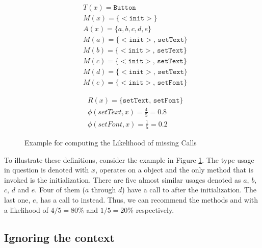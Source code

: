 \begin{figure}[h]
    \begin{subfigure}[c]{0.45\textwidth}
        \begin{align*}
& T(x) = \mathtt{Button} \\
& M(x) = \{ \mathtt{<\!\!init\!\!>} \} \\
& A(x) = \{ a, b, c, d, e \} \\
& M(a) = \{ \mathtt{<\!\!init\!\!>},\, \mathtt{setText} \} \\
& M(b) = \{ \mathtt{<\!\!init\!\!>},\, \mathtt{setText} \} \\
& M(c) = \{ \mathtt{<\!\!init\!\!>},\, \mathtt{setText} \} \\
& M(d) = \{ \mathtt{<\!\!init\!\!>},\, \mathtt{setText} \} \\
& M(e) = \{ \mathtt{<\!\!init\!\!>},\, \mathtt{setFont} \}
        \end{align*}
    \end{subfigure}
    \begin{subfigure}[c]{0.45\textwidth}
        \begin{align*}
& R(x) = \{ \mathtt{setText},\, \mathtt{setFont} \} \\
& \phi(setText, x) = \frac{4}{5} = 0.8 \\
& \phi(setFont, x) = \frac{1}{5} = 0.2
        \end{align*}
    \end{subfigure}
    \caption{Example for computing the Likelihood of missing Calls}
    \label{fig:missing_calls}
\end{figure}

To illustrate these definitions, consider the example in Figure \ref{fig:missing_calls}.
The type usage in question is denoted with $x$, operates on a  object and the only method that is invoked is the initialization.
There are five almost similar usages denoted as $a$, $b$, $c$, $d$ and $e$.
Four of them ($a$ through $d$) have a call to  after the initialization.
The last one, $e$, has a call to  instead.
Thus, we can recommend the methods  and  with a likelihood of $4/5 = 80\%$ and $1/5 = 20\%$ respectively.

\subsection{Ignoring the context}

